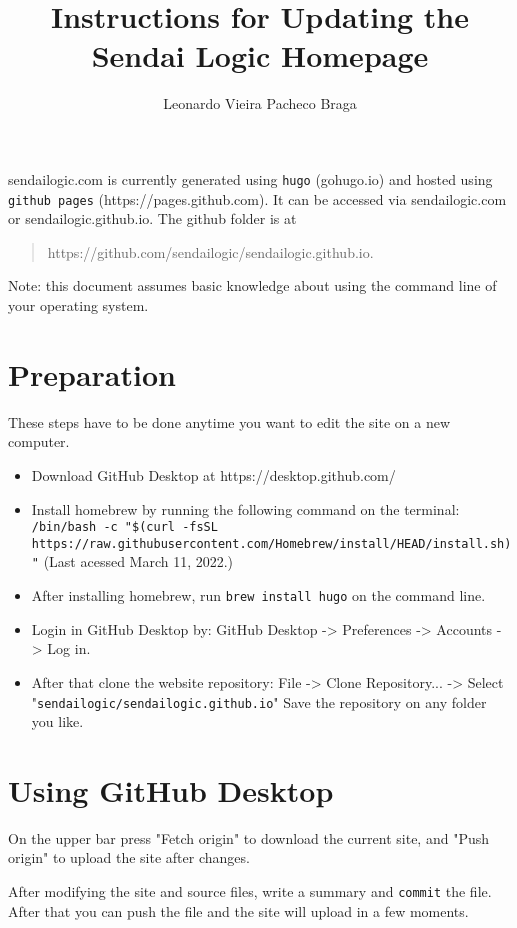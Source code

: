 \documentclass[a4paper]{article}
\title{Instructions for Updating the Sendai Logic Homepage}
\author{Leonardo Vieira Pacheco Braga}
\begin{document}
\maketitle

sendailogic.com is currently generated using \texttt{hugo} (gohugo.io) and hosted using \texttt{github pages} (https://pages.github.com).
It can be accessed via sendailogic.com or sendailogic.github.io.
The github folder is at
\begin{quote}
    https://github.com/sendailogic/sendailogic.github.io.
\end{quote}

Note: this document assumes basic knowledge about using the command line of your operating system.

\section{Preparation}
These steps have to be done anytime you want to edit the site on a new computer.

\begin{itemize}
    \item Download GitHub Desktop at https://desktop.github.com/
    \item Install homebrew by running the following command on the terminal: \texttt{/bin/bash -c "\$(curl -fsSL https://raw.githubusercontent.com/Homebrew/install/HEAD/install.sh)"} (Last acessed March 11, 2022.)
    \item After installing homebrew, run \texttt{brew install hugo} on the command line.
    \item Login in GitHub Desktop by: GitHub Desktop -> Preferences -> Accounts -> Log in.
    \item After that clone the website repository: File -> Clone Repository... -> Select "\texttt{sendailogic/sendailogic.github.io}" Save the repository on any folder you like.
\end{itemize}

\section{Using GitHub Desktop}
On the upper bar press "Fetch origin" to download the current site, and "Push origin" to upload the site after changes.

After modifying the site and source files, write a summary and \texttt{commit} the file. After that you can push the file and the site will upload in a few moments.
\end{document}
